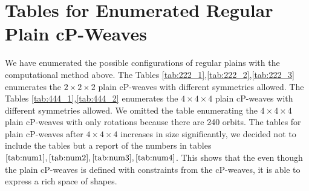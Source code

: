 \documentclass[unnumsec,webpdf,contemporary,large]{oup-authoring-template}%
\theoremstyle{thmstyleone}%
\theoremstyle{thmstyletwo}%
\theoremstyle{thmstylethree}%
\begin{document}
\newpage
\section*{Tables for Enumerated Regular Plain cP-Weaves}

We have enumerated the possible configurations of regular plains with the computational method above. The Tables \ref{tab:222_1},\ref{tab:222_2},\ref{tab:222_3} enumerates the $2\times2\times2$ plain cP-weaves with different symmetries allowed. The Tables \ref{tab:444_1},\ref{tab:444_2} enumerates the $4\times4\times4$ plain cP-weaves with different symmetries allowed. We omitted the table enumerating the $4\times4\times4$ plain cP-weaves with only rotations because there are 240 orbits. The tables for plain cP-weaves after $4\times 4\times 4$ increases in size significantly, we decided not to include the tables but a report of the numbers in tables $\ref{tab:num1},\ref{tab:num2},\ref{tab:num3},\ref{tab:num4}$. This shows that the even though the plain cP-weaves is defined with constraints from the cP-weaves, it is able to express a rich space of shapes.



\clearpage
\end{document}
